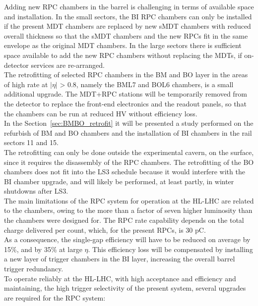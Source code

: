 \noindent Adding new RPC chambers in the barrel is challenging in terms of available space and
installation. In the small sectors, the BI RPC chambers can only be installed if the present
MDT chambers are replaced by new sMDT chambers with reduced overall thickness so that
the sMDT chambers and the new RPCs fit in the same envelope as the original MDT chambers.
In the large sectors there is sufficient space available to add the new RPC chambers
without replacing the MDTs, if on-detector services are re-arranged.\\
The retrofitting of selected RPC chambers in the BM and BO layer in the areas of high
rate at $|\eta|$ > 0.8, namely the BML7 and BOL6 chambers, is a small additional upgrade. The
MDT+RPC stations will be temporarily removed from the detector to replace the front-end
electronics and the readout panels, so that the chambers can be run at reduced HV without
efficiency loss. \\
In the Section~\ref{sec:BMBO_retrofit} it will be presented a study performed on the refurbish of
BM and BO chambers and the installation of BI chambers in the rail sectors 11 and 15.\\
The retrofitting can only be done outside the experimental cavern, on the
surface, since it requires the disassembly of the RPC chambers. The retrofitting of the BO
chambers does not fit into the LS3 schedule because it would interfere with the BI chamber
upgrade, and will likely be performed, at least partly, in winter shutdowns after LS3.\\
The main limitations of the RPC system for operation at the HL-LHC are related to the
chambers, owing to the more than a factor of seven higher luminosity than the chambers
were designed for. The RPC rate capability depends on the total charge delivered per count,
which, for the present RPCs, is 30 pC.\\
As a consequence, the single-gap efficiency will have to be reduced on average by 15\%, and by
35\% at large $\eta$. This efficiency loss will be compensated by installing a new layer of trigger chambers in the BI layer, increasing the overall barrel trigger redundancy.\\
To operate reliably at the HL-LHC, with high acceptance and efficiency and maintaining, the high trigger selectivity of the present system, several upgrades are required for the RPC system:
